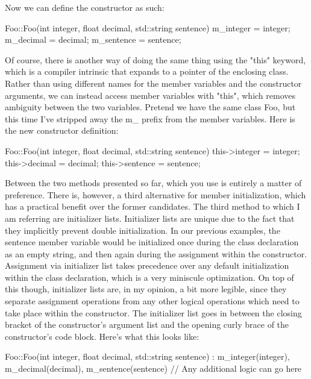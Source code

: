 \documentclass{article}
\begin{document}
Now we can define the constructor as such:

\begin{cpplst}

Foo::Foo(int integer, float decimal, std::string sentence)
{
    m_integer = integer;
    m_decimal = decimal;
    m_sentence = sentence;
}

\end{cpplst}

Of course, there is another way of doing the same thing using the "this" keyword, which is a compiler
intrinsic that expands to a pointer of the enclosing class. Rather than using different names for the member
variables and the constructor arguments, we can instead access member variables with "this", which removes
ambiguity between the two variables. Pretend we have the same class Foo, but this time I've stripped away the
m\_ prefix from the member variables. Here is the new constructor definition:

\begin{cpplst}

Foo::Foo(int integer, float decimal, std::string sentence)
{
    this->integer = integer;
    this->decimal = decimal;
    this->sentence = sentence;
}

\end{cpplst}

Between the two methods presented so far, which you use is entirely a matter of preference. There is, however,
a third alternative for member initialization, which has a practical benefit over the former candidates. The
third method to which I am referring are initializer lists. Initializer lists are unique due to the fact that
they implicitly prevent double initialization. In our previous examples, the sentence member variable would be
initialized once during the class declaration as an empty string, and then again during the assignment within
the constructor. Assignment via initializer list takes precedence over any default initialization within the
class declaration, which is a very miniscule optimization. On top of this though, initializer lists are, in my
opinion, a bit more legible, since they separate assignment operations from any other logical operations which
need to take place within the constructor. The initializer list goes in between the closing bracket of the
constructor's argument list and the opening curly brace of the constructor’s code block. Here's what this looks
like:

\begin{cpplst}

Foo::Foo(int integer, float decimal, std::string sentence) :
    m_integer(integer), m_decimal(decimal), m_sentence(sentence)
{
    // Any additional logic can go here
}

\end{cpplst}
\end{document}
